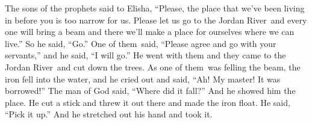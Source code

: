 
\begin{inparaenum}
   The sons of the prophets said to Elisha, ``Please, the place that we've been living in before you is too narrow for us.%
   Please let us go to the Jordan River\understood\ and every one will bring a beam and there we'll make a place for ourselves where we can live.'' So he said, ``Go.''%
   One of them\understood\ said, ``Please agree and go with your servants,'' and he said, ``I will go.''%
   He went with them and they came to the Jordan River\understood\ and cut down the trees.%
   As one of them\understood\ was felling the beam, the iron fell into the water, and he cried out and said, ``Ah! My master! It was borrowed!''%
   The man of God said, ``Where did it fall?'' And he showed him the place. He cut a stick and threw it out there and made the iron float.%
   He said, ``Pick it up.'' And he stretched out his hand and took it.%
  

\end{inparaenum}
